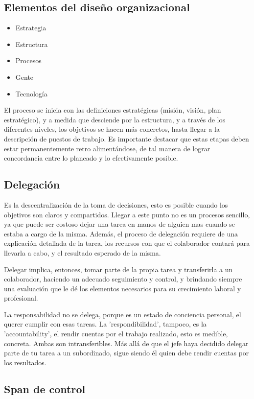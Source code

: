 \documentclass[titlepage,a4paper]{article}
\begin{document}
\subsection{Elementos del diseño organizacional}
\begin{itemize} %
    \item Estrategia
    \item Estructura
    \item Procesos
    \item Gente
    \item Tecnología
\end{itemize}

El proceso se inicia con las definiciones estratégicas (misión, visión, plan estratégico), y a medida que desciende por la estructura, y a través de los diferentes niveles, los objetivos se hacen más concretos, hasta llegar a la descripción de puestos de trabajo. Es importante destacar que estas etapas deben estar permanentemente retro alimentándose, de tal manera de lograr concordancia entre lo planeado y lo efectivamente posible.

\subsection{Delegación}
Es la descentralización de la toma de decisiones, esto es posible cuando los objetivos son claros y compartidos. Llegar a este punto no es un procesos sencillo, ya que puede ser costoso dejar una tarea en manos de alguien mas cuando se estaba a cargo de la misma. Además, el proceso de delegación requiere de una explicación detallada de la tarea, los recursos con que el colaborador contará para llevarla a cabo, y el resultado esperado de la misma.

Delegar implica, entonces, tomar parte de la propia tarea y transferirla a un colaborador, haciendo un adecuado seguimiento y control, y brindando siempre una evaluación que le dé los elementos necesarios para su crecimiento laboral y profesional.

La responsabilidad no se delega, porque es un estado de conciencia personal, el querer cumplir con esas tareas. La 'respondibilidad', tampoco, es la 'accountability', el rendir cuentas por el trabajo realizado, esto es medible, concreta. Ambas son intransferibles. Más allá de que el jefe haya decidido delegar parte de tu tarea a un subordinado, sigue siendo él quien debe rendir cuentas por los resultados.


\subsection{Span de control}
\end{document}

